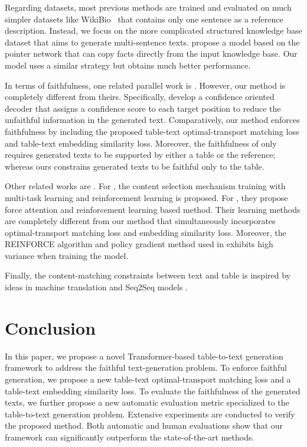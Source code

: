 \documentclass[11pt,a4paper]{article}
\begin{document}
Regarding datasets, most previous methods are trained and evaluated on much simpler datasets like WikiBio~\cite{Wikiemnlp2016} that contains only one sentence as a reference description. Instead, we focus on the more complicated structured knowledge base dataset \cite{Wang2018} that aims to generate multi-sentence texts. 
\citet{Wang2018} propose a model based on the pointer network that can copy facts directly from the input knowledge base. Our model uses a similar strategy but obtains much better performance.

In terms of faithfulness, one related parallel work is \citet{tian2019}. However, our method is completely different from theirs. Specifically, \citet{tian2019} develop a confidence oriented decoder that assigns a confidence score
to each target position to reduce the unfaithful information in the generated text. Comparatively, our method enforces faithfulness by including the proposed table-text optimal-transport matching loss and table-text embedding similarity loss.
Moreover, the faithfulness of \citet{tian2019} only requires generated texts to be supported by either a table or the reference; whereas ours constrains generated texts to be faithful only to the table.

Other related works are \cite{bootstrapgen2018, tabletotext2019}. For \cite{bootstrapgen2018}, the content selection mechanism training with multi-task learning and reinforcement learning is proposed. For \cite{tabletotext2019}, they propose force attention and reinforcement learning based method. Their learning methods are completely different from our method that simultaneously incorporates optimal-transport matching loss and embedding similarity loss. Moreover, the REINFORCE algorithm \cite{william1992} and policy gradient method used in \cite{bootstrapgen2018, tabletotext2019} exhibits high variance when training the model. 


Finally, the content-matching constraints between text and table is inspired by ideas in machine translation \cite{sentagree2019} and Seq2Seq models \cite{liqun2019}. 


\section{Conclusion}
In this paper, we propose a novel Transformer-based table-to-text generation framework to address the faithful text-generation problem. To enforce faithful generation, we propose a new table-text optimal-transport matching loss and a table-text embedding similarity loss. To evaluate the faithfulness of the generated texts, we further propose a new automatic evaluation metric specialized to the table-to-text generation problem. Extensive experiments are conducted to verify the proposed method. Both automatic and human evaluations show that our framework can significantly outperform the state-of-the-art methods. 
\end{document}

